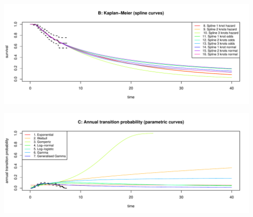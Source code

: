 \documentclass[]{article}
\begin{document}
\begin{flushleft}\includegraphics[height=0.29\textheight]{Images/validate_extrapolation1-2} \end{flushleft}

\begin{flushleft}\includegraphics[height=0.29\textheight]{Images/validate_extrapolation1-3} \end{flushleft}
\end{document}
